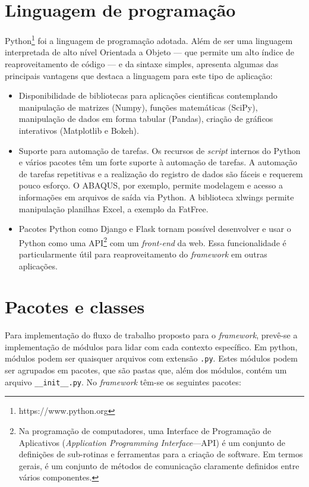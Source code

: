 \section{Linguagem de programação}

Python\footnote{https://www.python.org} foi a linguagem de programação adotada. Além de ser uma linguagem interpretada de alto nível Orientada a Objeto --- que permite um alto índice de reaproveitamento de código --- e da sintaxe simples,  apresenta algumas das principais vantagens que destaca a linguagem para este tipo de aplicação:

\begin{itemize}
    \item Disponibilidade de bibliotecas para aplicações cientificas contemplando manipulação de matrizes (Numpy), funções matemáticas (SciPy), manipulação de dados em forma tabular (Pandas), criação de gráficos interativos (Matplotlib e Bokeh).

    \item Suporte para automação de tarefas. Os recursos de \textit{script} internos do Python e vários pacotes têm um forte suporte à automação de tarefas. A automação de tarefas repetitivas e a realização do registro de dados são fáceis e requerem pouco esforço. O ABAQUS, por exemplo, permite modelagem e acesso a informações em arquivos de saída via Python. A biblioteca xlwings permite manipulação planilhas Excel, a exemplo da FatFree.

    \item Pacotes Python como Django e Flask tornam possível desenvolver e usar o Python como uma API\footnote{Na programação de computadores, uma Interface de Programação de Aplicativos (\textit{Application Programming Interface}---API) é um conjunto de definições de sub-rotinas e ferramentas para a criação de software. Em termos gerais, é um conjunto de métodos de comunicação claramente definidos entre vários componentes.} com um \textit{front-end} da web. Essa funcionalidade é particularmente útil para reaproveitamento do \textit{framework}  em outras aplicações.
\end{itemize}

\section{Pacotes e classes}

Para implementação do fluxo de trabalho proposto para o \textit{framework}, prevê-se a implementação de módulos para lidar com cada contexto específico. Em python, módulos podem ser quaisquer arquivos com extensão \texttt{.py}. Estes módulos podem ser agrupados em pacotes, que são pastas que, além dos módulos, contém um arquivo \texttt{\_\_init\_\_.py}. No \textit{framework} têm-se os seguintes pacotes: %

